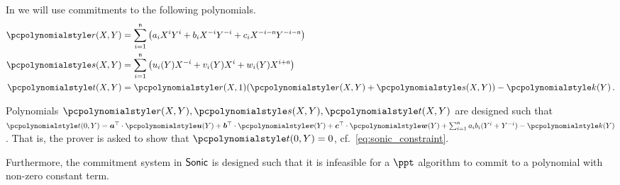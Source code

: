 In \sonic{} we will use commitments to the following polynomials.
\begin{align*}
  \pr(X, Y) & = \sum_{i = 1}^{\multconstr} \left(a_i X^i Y^i + b_i X^{-i} Y^{-i}
              + c_i X^{-i - \multconstr} Y^{-i - \multconstr}\right) \\
  \p{s}(X, Y) & = \sum_{i = 1}^{\multconstr} \left( u_i (Y) X^{-i} +
                v_i(Y) X^i + w_i(Y) X^{i + \multconstr}\right)\\
  \pt(X, Y) & = \pr(X, 1) (\pr(X, Y) + \p{s}(X, Y)) - \p{k}(Y)\,.
\end{align*}

Polynomials $\p{r} (X, Y), \p{s} (X, Y), \p{t} (X, Y)$ are designed such that
$\p{t} (0, Y) = \vec{a}^\top \cdot \vec{\p{u}} (Y) + \vec{b}^\top \cdot
\vec{\p{v}} (Y) + \vec{c}^\top \cdot \vec{\p{w}} (Y) + \sum_{i =
  1}^{\multconstr} a_i b_i (Y^i + Y^{-i}) - \p{k} (Y) $. That is, the prover is
asked to show that $\p{t} (0, Y) = 0$, cf.~\cref{eq:sonic_constraint}.

Furthermore, the commitment system in ${\textnormal{\textsf{Sonic}}}$ is designed such that it is
infeasible for a $\ppt$ algorithm to commit to a polynomial with non-zero
constant term.

